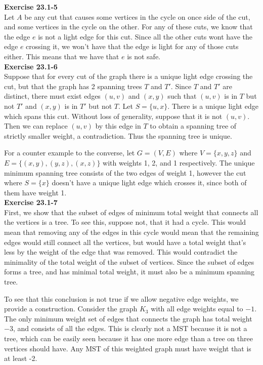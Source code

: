 \documentclass{article}
\begin{document}
\noindent\textbf{Exercise 23.1-5}\\

Let $A$ be any cut that causes some vertices in the cycle on once side of the cut, and some vertices in the cycle on the other. For any of these cuts, we know that the edge $e$ is not a light edge for this cut. Since all the other cuts wont have the edge $e$ crossing it, we won't have that the edge is light for any of those cuts either. This means that we have that $e$ is not safe. \\

\noindent\textbf{Exercise 23.1-6}\\

Suppose that for every cut of the graph there is a unique light edge crossing the cut, but that the graph has 2 spanning trees $T$ and $T'$.  Since $T$ and $T'$ are distinct, there must exist edges $(u,v)$ and $(x,y)$ such that $(u,v)$ is in $T$ but not $T'$ and $(x,y)$ is in $T'$ but not $T$.  Let $S = \{u, x\}$.  There is a unique light edge which spans this cut.  Without loss of generality, suppose that it is not $(u,v)$.  Then we can replace $(u,v)$ by this edge in $T$ to obtain a spanning tree of strictly smaller weight, a contradiction.  Thus the spanning tree is unique. 

For a counter example to the converse, let $G = (V,E)$ where $V = \{x,y,z\}$ and $E = \{ (x,y), (y,z), (x,z)\}$ with weights 1, 2, and 1 respectively.  The unique minimum spanning tree consists of the two edges of weight 1, however the cut where $S = \{ x\}$ doesn't have a unique light edge which crosses it, since both of them have weight 1. \\

\noindent\textbf{Exercise 23.1-7}\\

First, we show that the subset of edges of minimum total weight that connects all the vertices is a tree. To see this, suppose not, that it had a cycle. This would mean that removing any of the edges in this cycle would mean that the remaining edges would still connect all the vertices, but would have a total weight that's less by the weight of the edge that was removed. This would contradict the minimality of the total weight of the subset of vertices. Since the subset of edges forms a tree, and has minimal total weight, it must also be a minimum spanning tree.

To see that this conclusion is not true if we allow negative edge weights, we provide a construction. Consider the graph $K_3$ with all edge weights equal to $-1$. The only minimum weight set of edges that connects the graph has total weight $-3$, and consists of all the edges. This is clearly not a MST because it is not a tree, which can be easily  seen because it has one more edge than a tree on three vertices should have. Any MST of this weighted graph must have weight that is at least -2.\\
\end{document}
